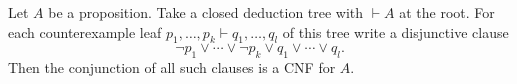 

\setcounter{section}{2}
\setcounter{subsection}{8}
\setcounter{dfn}{19}

\begin{thm}
Let $A$ be a proposition.
Take a closed deduction tree with $\vdash A$ at the root.
For each counterexample leaf $p_1, \ldots, p_k \vdash q_1, \ldots, q_l$ of this tree write a disjunctive clause
\[
\neg p_1 \vee \cdots \vee \neg p_k \vee q_1 \vee \cdots \vee q_l.
\]
Then the conjunction of all such clauses is a CNF for $A$.
\end{thm}



